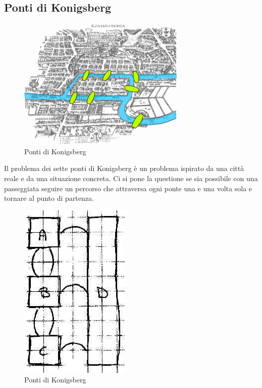 \documentclass[a4paper]{report}
\begin{document}
\subsection{Ponti di Konigsberg}
\begin{figure}[!h]
  \begin{center}
    \includegraphics[scale=0.5]{./figures/konigsberg_bridges.png}
    \caption{Ponti di Konigsberg}\label{fig:konigsberg_bridges}
  \end{center}
\end{figure} 
Il problema dei sette ponti di Konigsberg \`e un problema ispirato da
una citt\`a reale e da una situazione concreta.
Ci si pone la questione se sia possibile con una passeggiata seguire
un percorso che attraversa ogni ponte una e una volta sola e tornare
al punto di partenza.
\begin{figure}[!h]
  \begin{center}
    \includegraphics[scale=0.4]{./images/pontiKonigsberg00}
    \caption{Ponti di Konigsberg}\label{fig:konigsberg_bridges00}
  \end{center}
\end{figure}
\end{document}
